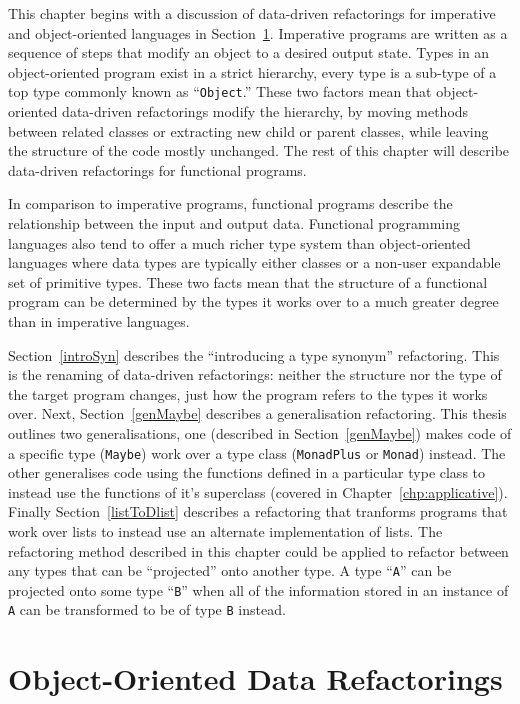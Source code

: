 This chapter begins with a discussion of data-driven refactorings for imperative and object-oriented languages in Section~\ref{ooRefs}. Imperative programs are written as a sequence of steps that modify an object to a desired output state. Types in an object-oriented program exist in a strict hierarchy, every type is a sub-type of a top type commonly known as ``\texttt{Object}.'' These two factors mean that object-oriented data-driven refactorings modify the hierarchy, by moving methods between related classes or extracting new child or parent classes, while leaving the structure of the code mostly unchanged. The rest of this chapter will describe data-driven refactorings for functional programs.

In comparison to imperative programs, functional programs describe the relationship between the input and output data. Functional programming languages also tend to offer a much richer type system than object-oriented languages where data types are typically either classes or a non-user expandable set of primitive types. These two facts mean that the structure of a functional program can be determined by the types it works over to a much greater degree than in imperative languages.

Section~\ref{introSyn} describes the ``introducing a type synonym'' refactoring. This is the renaming of data-driven refactorings: neither the structure nor the type of the target program changes, just how the program refers to the types it works over. Next, Section~\ref{genMaybe} describes a generalisation refactoring. This thesis outlines two generalisations, one (described in Section~\ref{genMaybe}) makes code of a specific type (\texttt{Maybe}) work over a type class (\texttt{MonadPlus} or \texttt{Monad}) instead. The other generalises code using the functions defined in a particular type class to instead use the functions of it's superclass (covered in Chapter~\ref{chp:applicative}). Finally Section~\ref{listToDlist} describes a refactoring that tranforms programs that work over lists to instead use an alternate implementation of lists. The refactoring method described in this chapter could be applied to refactor between any types that can be ``projected'' onto another type. A type ``\texttt{A}'' can be projected onto some type ``\texttt{B}'' when all of the information stored in an instance of \texttt{A} can be transformed to be of type \texttt{B} instead. 

\section{Object-Oriented Data Refactorings}\label{ooRefs}

